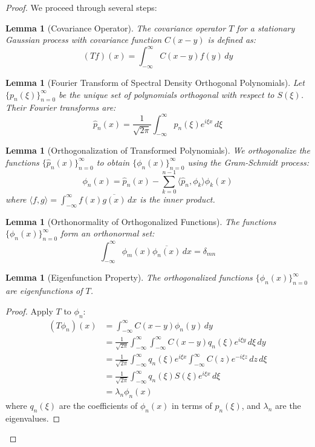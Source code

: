 \documentclass{article}
\newtheorem{lemma}[theorem]{Lemma}
\begin{document}
\begin{proof}
We proceed through several steps:

\begin{lemma}[Covariance Operator]
The covariance operator $T$ for a stationary Gaussian process with covariance function $C(x-y)$ is defined as:
\[
(Tf)(x) = \int_{-\infty}^{\infty} C(x-y) f(y) \, dy
\]
\end{lemma}

\begin{lemma}[Fourier Transform of Spectral Density Orthogonal Polynomials]
Let $\{p_n(\xi)\}_{n=0}^{\infty}$ be the unique set of polynomials orthogonal with respect to $S(\xi)$. Their Fourier transforms are:
\[
\hat{p}_n(x) = \frac{1}{\sqrt{2\pi}} \int_{-\infty}^\infty p_n(\xi) e^{i\xi x} \, d\xi
\]
\end{lemma}

\begin{lemma}[Orthogonalization of Transformed Polynomials]
We orthogonalize the functions $\{\hat{p}_n(x)\}_{n=0}^{\infty}$ to obtain $\{\phi_n(x)\}_{n=0}^{\infty}$ using the Gram-Schmidt process:
\[
\phi_n(x) = \hat{p}_n(x) - \sum_{k=0}^{n-1} \langle \hat{p}_n, \phi_k \rangle \phi_k(x)
\]
where $\langle f, g \rangle = \int_{-\infty}^{\infty} f(x) \overline{g(x)} \, dx$ is the inner product.
\end{lemma}

\begin{lemma}[Orthonormality of Orthogonalized Functions]
The functions $\{\phi_n(x)\}_{n=0}^{\infty}$ form an orthonormal set:
\[
\int_{-\infty}^{\infty} \phi_m(x) \overline{\phi_n(x)} \, dx = \delta_{mn}
\]
\end{lemma}

\begin{lemma}[Eigenfunction Property]
The orthogonalized functions $\{\phi_n(x)\}_{n=0}^{\infty}$ are eigenfunctions of $T$.
\end{lemma}

\begin{proof}
Apply $T$ to $\phi_n$:
\begin{align*}
(T\phi_n)(x) &= \int_{-\infty}^{\infty} C(x-y) \phi_n(y) \, dy \\
&= \frac{1}{\sqrt{2\pi}} \int_{-\infty}^{\infty} \int_{-\infty}^{\infty} C(x-y) q_n(\xi) e^{i\xi y} \, d\xi \, dy \\
&= \frac{1}{\sqrt{2\pi}} \int_{-\infty}^{\infty} q_n(\xi) e^{i\xi x} \int_{-\infty}^{\infty} C(z) e^{-i\xi z} \, dz \, d\xi \\
&= \frac{1}{\sqrt{2\pi}} \int_{-\infty}^{\infty} q_n(\xi) S(\xi) e^{i\xi x} \, d\xi \\
&= \lambda_n \phi_n(x)
\end{align*}
where $q_n(\xi)$ are the coefficients of $\phi_n(x)$ in terms of $p_n(\xi)$, and $\lambda_n$ are the eigenvalues.
\end{proof}


\end{proof}
\end{document}
